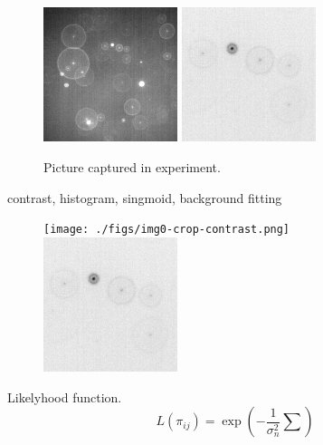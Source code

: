 \begin{figure}
\centering
\includegraphics[width=0.35\textwidth]{figs/image1.png}\qquad
\includegraphics[width=0.35\textwidth]{figs/img0-crop.png}
\label{fig:input}
\caption{Picture captured in experiment.}
\end{figure}


contrast, histogram, singmoid, background fitting

\begin{figure}
\centering
\texttt{[image: ./figs/img0-crop-contrast.png]}
\includegraphics[width=0.35\textwidth]{figs/img0-crop.png}
\end{figure}


Likelyhood function. 
\begin{equation}
    L(\pi_{ij}) = \exp\left( -\frac{1}{\sigma_n^2 } \sum \right)
\end{equation}

